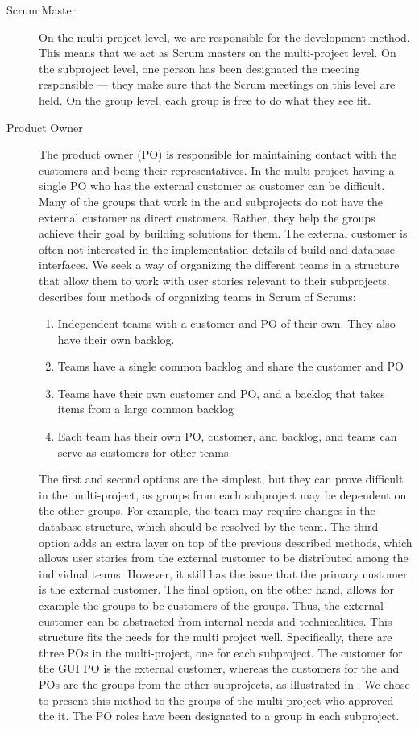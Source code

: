 \begin{description}
  \item[Scrum Master] On the multi-project level, we are responsible for the development method. This means that we act as Scrum masters on the multi-project level. On the subproject level, one person has been designated the meeting responsible --- they make sure that the Scrum meetings on this level are held. On the group level, each group is free to do what they see fit.
  \item[Product Owner] The product owner (PO) is responsible for maintaining contact with the customers and being their representatives. In the multi-project having a single PO who has the external customer as customer can be difficult. Many of the groups that work in the \bd and \db subprojects do not have the external customer as direct customers. Rather, they help the \gui groups achieve their goal by building solutions for them. The external customer is often not interested in the implementation details of build and database interfaces. We seek a way of organizing the different teams in a structure that allow them to work with user stories relevant to their subprojects.  \textcite{bird_davies_2007} describes four methods of organizing teams in Scrum of Scrums:
  \begin{enumerate}
    \item Independent teams with a customer and PO of their own. They also have their own backlog.
    \item Teams have a single common backlog and share the customer and PO
    \item Teams have their own customer and PO, and a backlog that takes items from a large common backlog
    \item Each team has their own PO, customer, and backlog, and teams can serve as customers for other teams.
  \end{enumerate}
The first and second options are the simplest, but they can prove difficult in the multi-project, as groups from each subproject may be dependent on the other groups. For example, the \gui{} team may require changes in the database structure, which should be resolved by the \db team. The third option adds an extra layer on top of the previous described methods, which allows user stories from the external customer to be distributed among the individual teams. However, it still has the issue that the primary customer is the external customer. The final option, on the other hand, allows for example the \gui groups to be customers of the \bd groups. Thus, the external customer can be abstracted from internal needs and technicalities. This structure fits the needs for the multi project well. Specifically, there are three POs in the multi-project, one for each subproject. The customer for the GUI PO is the external customer, whereas the customers for the \db and \bd POs are the groups from the other subprojects, as illustrated in . We chose to present this method to the groups of the multi-project who approved the it. The PO roles have been designated to a group in each subproject.

\end{description}

